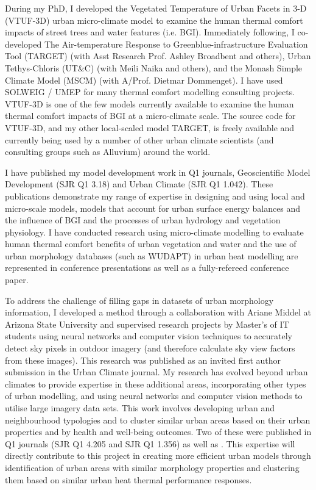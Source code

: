 During my PhD, I developed the Vegetated Temperature of Urban Facets in 3-D (VTUF-3D)\cite{Nice2018a} urban micro-climate model to examine the human thermal comfort impacts of street trees and water features (i.e. BGI). Immediately following, I co-developed The Air-temperature Response to Greenblue-infrastructure Evaluation Tool (TARGET)\cite{Broadbent2019c} (with Asst Research Prof. Ashley Broadbent and others), Urban Tethys-Chloris (UT\&C)\cite{Meili2020} (with Meili Naika and others), and the Monash Simple Climate Model\cite{Dommenget2019} (MSCM) (with A/Prof. Dietmar Dommenget). I have used SOLWEIG / UMEP\cite{Lindberg2018} for many thermal comfort modelling consulting projects. VTUF-3D is one of the few models currently available to examine the human thermal comfort impacts of BGI at a micro-climate scale. The source code for VTUF-3D, and my other local-scaled model TARGET, is freely available and currently being used by a number of other urban climate scientists (and consulting groups such as Alluvium\cite{MosiacInsights2020}) around the world. 

I have published my model development work\cite{Nice2018a,Broadbent2019c,Meili2020,Dommenget2019} in Q1 journals, Geoscientific Model Development (SJR Q1 3.18) and Urban Climate (SJR Q1 1.042). These publications demonstrate my range of expertise in designing and using local and micro-scale models, models that account for urban surface energy balances and the influence of BGI and the processes of urban hydrology and vegetation physiology. I have conducted research using micro-climate modelling to evaluate human thermal comfort benefits of urban vegetation and water and the use of urban morphology databases (such as WUDAPT) in urban heat modelling are represented in conference presentations\cite{Gal2020,Nice2020b} as well as a fully-refereed conference paper\cite{Todorovic2019a}.

To address the challenge of filling gaps in datasets of urban morphology information, I developed a method through a collaboration with Ariane Middel at Arizona State University and supervised research projects by Master’s of IT students using neural networks and computer vision techniques to accurately detect sky pixels in outdoor imagery (and therefore calculate sky view factors from these images). This research was published as an invited first author submission\cite{Nice2020} in the Urban Climate journal. My research has evolved beyond urban climates to provide expertise in these additional areas, incorporating other types of urban modelling, and using neural networks and computer vision methods to utilise large imagery data sets. This work involves developing urban and neighbourhood typologies and to cluster similar urban areas based on their urban properties and by health and well-being outcomes. Two of these were published in Q1 journals\cite{Thompson2020,Wijnands2019} (SJR Q1 4.205 and SJR Q1 1.356) as well as \cite{Nice2020a}. This expertise will directly contribute to this project in creating more efficient urban models through identification of urban areas with similar morphology properties and clustering them based on similar urban heat thermal performance responses.

